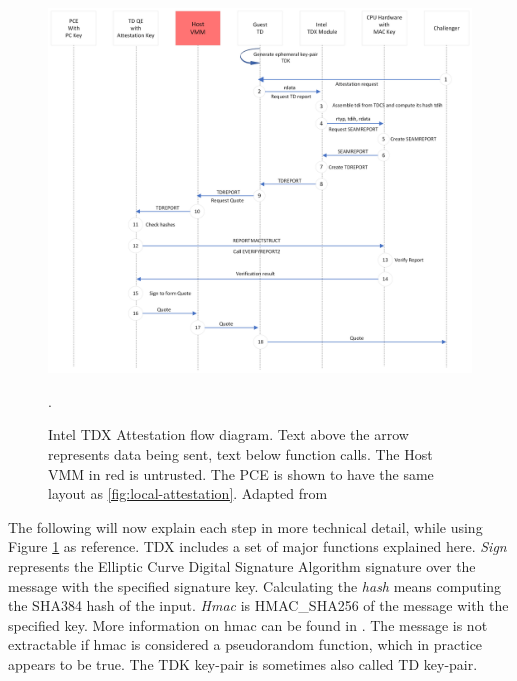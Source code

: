 \begin{figure}
\centering
\includegraphics[width=\textwidth]{figures/Attestation Diagram.png}
\caption{Intel TDX Attestation flow diagram. Text above the arrow represents data being sent, text below function calls. The Host VMM in red is untrusted. The PCE is shown to have the same layout as \cref{fig:local-attestation}. Adapted from \cite{sardar_demystifying_2021}}.
\label{fig:QuoteGeneration}
\end{figure}
The following will now explain each step in more technical detail, while using Figure \ref{fig:QuoteGeneration} as reference. 
TDX includes a set of major functions explained here. \textit{Sign} represents the Elliptic Curve Digital Signature Algorithm signature over the message with the specified signature key. 
Calculating the \textit{hash} means computing the SHA384 hash of the input. \textit{Hmac} is HMAC\_SHA256 of the message with the specified key. More information on hmac can be found in \cite{hmac_keying_1996}. The message is not extractable if hmac is considered a pseudorandom function, which in practice appears to be true\cite{bellare_new_2006}. The TDK key-pair is sometimes also called TD key-pair.
